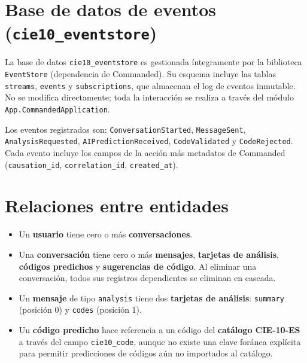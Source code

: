 \section{Base de datos de eventos (\texttt{cie10\_eventstore})}

La base de datos \texttt{cie10\_eventstore} es gestionada íntegramente por la biblioteca \texttt{EventStore} (dependencia de Commanded). Su esquema incluye las tablas \texttt{streams}, \texttt{events} y \texttt{subscriptions}, que almacenan el log de eventos inmutable. No se modifica directamente; toda la interacción se realiza a través del módulo \texttt{App.CommandedApplication}.

\begin{sloppypar}
Los eventos registrados son: \texttt{ConversationStarted}, \texttt{MessageSent}, \texttt{AnalysisRequested}, \texttt{AIPredictionReceived}, \texttt{CodeValidated} y \texttt{CodeRejected}. Cada evento incluye los campos de la acción más metadatos de Commanded (\texttt{causation\_id}, \texttt{correlation\_id}, \texttt{created\_at}).
\end{sloppypar}

\section{Relaciones entre entidades}

\begin{itemize}
    \item Un \textbf{usuario} tiene cero o más \textbf{conversaciones}.
    \item Una \textbf{conversación} tiene cero o más \textbf{mensajes}, \textbf{tarjetas de análisis}, \textbf{códigos predichos} y \textbf{sugerencias de código}. Al eliminar una conversación, todos sus registros dependientes se eliminan en cascada.
    \item Un \textbf{mensaje} de tipo \texttt{analysis} tiene dos \textbf{tarjetas de análisis}: \texttt{summary} (posición 0) y \texttt{codes} (posición 1).
    \item Un \textbf{código predicho} hace referencia a un código del \textbf{catálogo CIE-10-ES} a través del campo \texttt{cie10\_code}, aunque no existe una clave foránea explícita para permitir predicciones de códigos aún no importados al catálogo.
\end{itemize}
